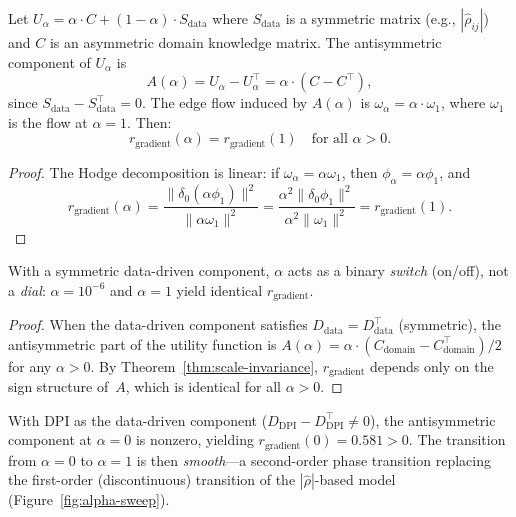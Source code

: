 \documentclass[twoside,11pt]{article}
\newcommand{\DPI}{\mathrm{DPI}}
\begin{document}
\begin{theorem}
\label{thm:scale-invariance}
Let $U_\alpha = \alpha\cdot C + (1-\alpha)\cdot S_{\mathrm{data}}$ where
$S_{\mathrm{data}}$ is a symmetric matrix (e.g., $|\hat\rho_{ij}|$) and
$C$ is an asymmetric domain knowledge matrix.  The antisymmetric
component of $U_\alpha$ is
\[
  A(\alpha) = U_\alpha - U_\alpha^\top = \alpha\cdot(C-C^\top),
\]
since $S_{\mathrm{data}}-S_{\mathrm{data}}^\top=0$.  The edge flow
induced by $A(\alpha)$ is $\omega_\alpha=\alpha\cdot\omega_1$, where
$\omega_1$ is the flow at $\alpha=1$.  Then:
\[
  r_{\mathrm{gradient}}(\alpha) = r_{\mathrm{gradient}}(1)
  \quad\text{for all } \alpha>0.
\]
\end{theorem}

\begin{proof}
The Hodge decomposition is linear: if $\omega_\alpha=\alpha\omega_1$,
then $\phi_\alpha=\alpha\phi_1$, and
\[
  r_{\mathrm{gradient}}(\alpha)
  = \frac{\|\delta_0(\alpha\phi_1)\|^2}{\|\alpha\omega_1\|^2}
  = \frac{\alpha^2\|\delta_0\phi_1\|^2}{\alpha^2\|\omega_1\|^2}
  = r_{\mathrm{gradient}}(1).
\]
\end{proof}

\begin{corollary}
\label{cor:switch}
With a symmetric data-driven component, $\alpha$ acts as a binary
\emph{switch} (on/off), not a \emph{dial}: $\alpha=10^{-6}$ and
$\alpha=1$ yield identical $r_{\mathrm{gradient}}$.
\end{corollary}

\begin{proof}
When the data-driven component satisfies
$D_{\mathrm{data}}=D_{\mathrm{data}}^\top$ (symmetric), the
antisymmetric part of the utility function is
$A(\alpha)=\alpha\cdot(C_{\mathrm{domain}}-C_{\mathrm{domain}}^\top)/2$
for any $\alpha>0$.  By Theorem~\ref{thm:scale-invariance},
$r_{\mathrm{gradient}}$ depends only on the sign structure of~$A$,
which is identical for all $\alpha>0$.
\end{proof}

\begin{remark}
With DPI as the data-driven component ($D_{\DPI}-D_{\DPI}^\top\ne 0$),
the antisymmetric component at $\alpha=0$ is nonzero, yielding
$r_{\mathrm{gradient}}(0)=0.581>0$.  The transition from $\alpha=0$ to
$\alpha=1$ is then \emph{smooth}---a second-order phase transition
replacing the first-order (discontinuous) transition of the
$|\hat\rho|$-based model (Figure~\ref{fig:alpha-sweep}).
\end{remark}
\end{document}
